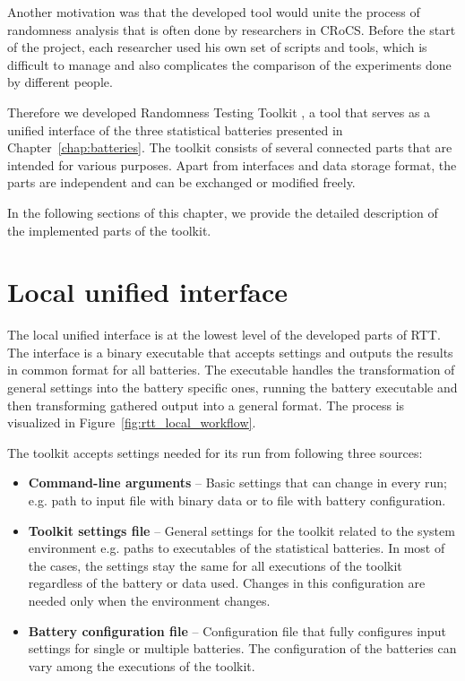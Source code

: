 \documentclass[
	digital,    %
	oneside,
	color,
	11pt,
	nocover,
	notable,
	nolof,
	nolot,
]{fithesis3}
\theoremstyle{definition}
\theoremstyle{remark}
\begin{document}
Another motivation was that the developed tool would unite the process of randomness analysis that is often done by researchers in CRoCS. Before the start of the project, each researcher used his own set of scripts and tools, which is difficult to manage and also complicates the comparison of the experiments done by different people.

Therefore we developed Randomness Testing Toolkit \cite{rtt-github}, a tool that serves as a unified interface of the three statistical batteries presented in Chapter~\ref{chap:batteries}. The toolkit consists of several connected parts that are intended for various purposes. Apart from interfaces and data storage format, the parts are independent and can be exchanged or modified freely. 

In the following sections of this chapter, we provide the detailed description of the implemented parts of the toolkit.

\section{Local unified interface}
The local unified interface is at the lowest level of the developed parts of RTT. The interface is a binary executable that accepts settings and outputs the results in common format for all batteries. The executable handles the transformation of general settings into the battery specific ones, running the battery executable and then transforming gathered output into a general format. The process is visualized in Figure~\ref{fig:rtt_local_workflow}.

The toolkit accepts settings needed for its run from following three sources:
\begin{itemize}
\item \textbf{Command-line arguments} -- Basic settings that can change in every run; e.g. path to input file with binary data or to file with battery configuration.
\item \textbf{Toolkit settings file} -- General settings for the toolkit related to the system environment e.g. paths to executables of the statistical batteries. In most of the cases, the settings stay the same for all executions of the toolkit regardless of the battery or data used. Changes in this configuration are needed only when the environment changes.
\item \textbf{Battery configuration file} -- Configuration file that fully configures input settings for single or multiple batteries. The configuration of the batteries can vary among the executions of the toolkit.
\end{itemize}
\end{document}
